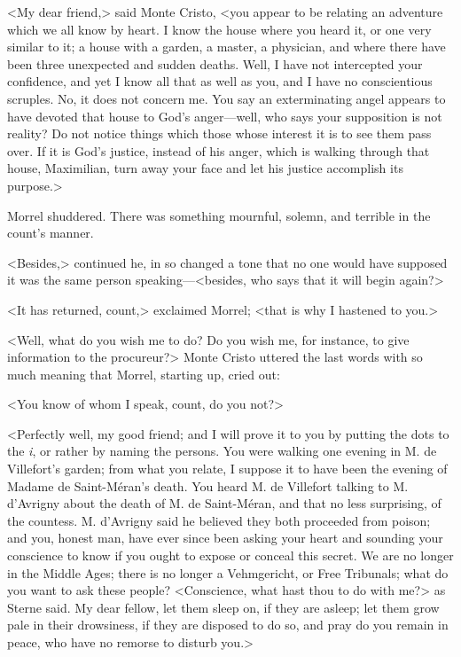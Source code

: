  <My dear friend,> said Monte Cristo, <you appear to be relating an adventure which we all know by heart. I know the house where you heard it, or one very similar to it; a house with a garden, a master, a physician, and where there have been three unexpected and sudden deaths. Well, I have not intercepted your confidence, and yet I know all that as well as you, and I have no conscientious scruples. No, it does not concern me. You say an exterminating angel appears to have devoted that house to God's anger—well, who says your supposition is not reality? Do not notice things which those whose interest it is to see them pass over. If it is God's justice, instead of his anger, which is walking through that house, Maximilian, turn away your face and let his justice accomplish its purpose.> 

 Morrel shuddered. There was something mournful, solemn, and terrible in the count's manner. 

 <Besides,> continued he, in so changed a tone that no one would have supposed it was the same person speaking—<besides, who says that it will begin again?> 

 <It has returned, count,> exclaimed Morrel; <that is why I hastened to you.> 

 <Well, what do you wish me to do? Do you wish me, for instance, to give information to the procureur?> Monte Cristo uttered the last words with so much meaning that Morrel, starting up, cried out: 

 <You know of whom I speak, count, do you not?> 

 <Perfectly well, my good friend; and I will prove it to you by putting the dots to the \textit{i}, or rather by naming the persons. You were walking one evening in M. de Villefort's garden; from what you relate, I suppose it to have been the evening of Madame de Saint-Méran's death. You heard M. de Villefort talking to M. d'Avrigny about the death of M. de Saint-Méran, and that no less surprising, of the countess. M. d'Avrigny said he believed they both proceeded from poison; and you, honest man, have ever since been asking your heart and sounding your conscience to know if you ought to expose or conceal this secret. We are no longer in the Middle Ages; there is no longer a Vehmgericht, or Free Tribunals; what do you want to ask these people? <Conscience, what hast thou to do with me?> as Sterne said. My dear fellow, let them sleep on, if they are asleep; let them grow pale in their drowsiness, if they are disposed to do so, and pray do you remain in peace, who have no remorse to disturb you.> 

